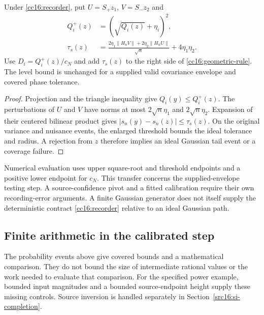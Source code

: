 \begin{proposition}
\label{cc16:calibrated-rounding}
Under \eqref{cc16:recorder}, put $U=S_+z_1$, $V=S_-z_2$ and
\begin{align}
 Q_i^+(z)&=(\sqrt{Q_i(z)}+\eta_i)^2,\label{cc16:rounded-energy}\\
 \tau_s(z)&=\frac{2\eta_1\|H_nV\|+2\eta_2\|H_nU\|}{\sqrt n}
                 +4\eta_1\eta_2.\label{cc16:contrast-error}
\end{align}
Use $D_i=Q_i^+(z)/c_N$ and add $\tau_s(z)$ to the right side of \eqref{cc16:geometric-rule}. The level bound is unchanged for a supplied valid covariance envelope and covered phase tolerance.
\end{proposition}
\begin{proof}
Projection and the triangle inequality give $Q_i(y)\le Q_i^+(z)$. The perturbations of $U$ and $V$ have norms at most $2\sqrt n\eta_1$ and $2\sqrt n\eta_2$. Expansion of their centered bilinear product gives $|s_n(y)-s_n(z)|\le\tau_s(z)$. On the original variance and nuisance events, the enlarged threshold bounds the ideal tolerance and radius. A rejection from $z$ therefore implies an ideal Gaussian tail event or a coverage failure.
\end{proof}

Numerical evaluation uses upper square-root and threshold endpoints and a positive lower endpoint for $c_N$. This transfer concerns the supplied-envelope testing step. A source-confidence pivot and a fitted calibration require their own recording-error arguments. A finite Gaussian generator does not itself supply the deterministic contract \eqref{cc16:recorder} relative to an ideal Gaussian path.

\subsection{Finite arithmetic in the calibrated step}

The probability events above give covered bounds and a mathematical comparison. They do not bound the size of intermediate rational values or the work needed to evaluate that comparison. For the specified power example, bounded input magnitudes and a bounded source-endpoint height supply these missing controls. Source inversion is handled separately in Section~\ref{src16:si-completion}.

